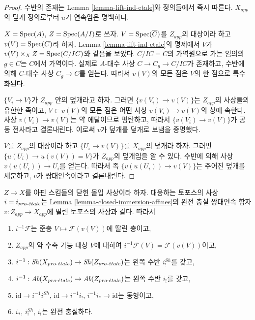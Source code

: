 \begin{proof}
수반의 존재는 Lemma \ref{lemma-lift-ind-etale}와 정의들에서 즉시
따른다. $X_{app}$의 덮개 정의로부터 $u$가 연속임은 명백하다.

\medskip\noindent
$X = \mathop{\mathrm{Spec}}(A)$, $Z = \mathop{\mathrm{Spec}}(A/I)$로 쓰자. $V = \mathop{\mathrm{Spec}}(\overline{C})$를
$Z_{app}$의 대상이라 하고 $v(V) = \mathop{\mathrm{Spec}}(C)$라 하자. Lemma
\ref{lemma-lift-ind-etale}의 명제에서 $V$가
$v(V) \times_X Z = \mathop{\mathrm{Spec}}(C/IC)$와 같음을 보았다.
$C/IC = \overline{C}$의 가역원으로 가는 임의의 $g \in C$는 $C$에서
가역이다. 실제로 $A$-대수 사상 $C \to C_g \to C/IC$가 존재하고,
수반에 의해 $C$-대수 사상 $C_g \to C$를 얻는다. 따라서 $v(V)$의
모든 점은 $V$의 한 점으로 특수화된다.

\medskip\noindent
$\{V_i \to V\}$가 $Z_{app}$ 안의 덮개라고 하자. 그러면
$\{v(V_i) \to v(V)\}$는 $Z_{app}$의 사상들의 유한한 족이고,
$V \subset v(V)$의 모든 점은 어떤 사상 $v(V_i) \to v(V)$의 상에
속한다. 사상 $v(V_i) \to v(V)$는 약 에탈이므로 평탄하고, 따라서
$\{v(V_i) \to v(V)\}$가 공동 전사라고 결론내린다. 이로써 $v$가
덮개를 덮개로 보냄을 증명했다.

\medskip\noindent
$V$를 $Z_{app}$의 대상이라 하고 $\{U_i \to v(V)\}$를 $X_{app}$의
덮개라 하자. 그러면
$\{u(U_i) \to u(v(V)) = V\}$가 $Z_{app}$의 덮개임을 알 수 있다.
수반에 의해 사상 $v(u(U_i)) \to U_i$를 얻는다. 따라서 족
$\{v(u(U_i)) \to v(V)\}$는 주어진 덮개를 세분하고, $v$가
쌍대연속이라고 결론내린다.
\end{proof}

\begin{lemma}
\label{lemma-closed-immersion-affines-apply}
$Z \to X$를 아핀 스킴들의 닫힌 몰입 사상이라 하자. 대응하는 토포스의
사상 $i = i_{pro\text{-}\acute{e}tale}$는 Lemma
\ref{lemma-closed-immersion-affines}의 완전 충실 쌍대연속 함자
$v : Z_{app} \to X_{app}$에 딸린 토포스의 사상과 같다. 따라서
\begin{enumerate}
\item $i^{-1}\mathcal{F}$는 준층
$V \mapsto \mathcal{F}(v(V))$에 딸린 층이고,
\item $Z_{app}$의 약 수축 가능 대상 $V$에 대하여
$i^{-1}\mathcal{F}(V) = \mathcal{F}(v(V))$이고,
\item $i^{-1} : \mathop{\mathit{Sh}}\nolimits(X_{pro\text{-}\acute{e}tale}) \to \mathop{\mathit{Sh}}\nolimits(Z_{pro\text{-}\acute{e}tale})$는 왼쪽 수반
$i^{Sh}_!$를 갖고,
\item $i^{-1} : \textit{Ab}(X_{pro\text{-}\acute{e}tale}) \to
\textit{Ab}(Z_{pro\text{-}\acute{e}tale})$는 왼쪽 수반 $i_!$를 갖고,
\item $\text{id} \to i^{-1}i^{Sh}_!$, $\text{id} \to i^{-1}i_!$,
$i^{-1}i_* \to \text{id}$는 동형이고,
\item $i_*$, $i^{Sh}_!$, $i_!$는 완전 충실하다.
\end{enumerate}
\end{lemma}

